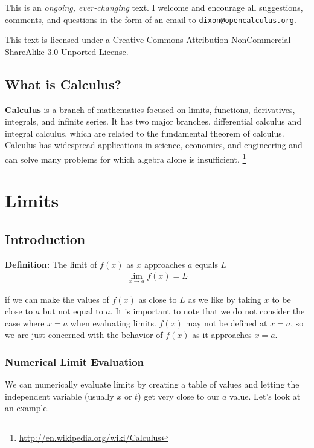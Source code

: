 \documentclass[oneside]{article}
\begin{document}
This is an \textit{ongoing, ever-changing} text. I welcome and encourage all suggestions, comments, and questions in the form of an email to \texttt{\href{mailto:dixon@opencalculus.org}{dixon@opencalculus.org}}. 

This text is licensed under a \href{http://creativecommons.org/licenses/by-nc-sa/3.0/deed.en_US}{Creative Commons Attribution-NonCommercial-ShareAlike 3.0 Unported License}.

\subsection{What is Calculus?}
\textbf{Calculus} is a branch of mathematics focused on limits, functions, derivatives, integrals, and infinite series. It has two major branches, differential calculus and integral calculus, which are related to the fundamental theorem of calculus. Calculus has widespread applications in science, economics, and engineering and can solve many problems for which algebra alone is insufficient. \footnote{\url{http://en.wikipedia.org/wiki/Calculus}}

\section{Limits}

\subsection{Introduction}
\textbf{Definition:} The limit of $f(x)$ as $x$ approaches $a$ equals $L$
\begin{align*}
	\lim_{x \to a} f(x) = L
\end{align*}

if we can make the values of $f(x)$ as close to $L$ as we like by taking $x$ to be close to $a$ but not equal to $a$. It is important to note that we do not consider the case where $x = a$ when evaluating limits. $f(x)$ may not be defined at $x = a$, so we are just concerned with the behavior of $f(x)$ as it approaches $x = a$. \\

\subsubsection{Numerical Limit Evaluation}
We can numerically evaluate limits by creating a table of values and letting the independent variable (usually $x$ or $t$) get very close to our $a$ value. Let's look at an example. \\
\end{document}
